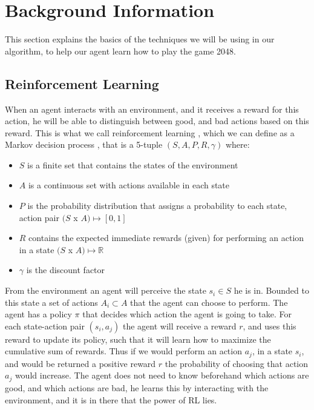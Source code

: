 \documentclass[a4paper,12pt]{article}
\begin{document}
\section{Background Information}
This section explains the basics of the techniques we will be using in our algorithm, to help our agent learn how to play the game 2048. 
\subsection{Reinforcement Learning}
When an agent interacts with an environment, and it receives a reward for this action, he will be able to distinguish between good, and bad actions based on this reward. This is what we call reinforcement learning \cite{sutton1998rl}, which we can define as a Markov decision process \cite{howard1960mdp}, that is a 5-tuple $(S, A, P, R, \gamma)$ where:
\begin{itemize}
\item $S$ is a finite set that contains the states of the environment
\item $A$ is a continuous set with actions available in each state
\item $P$ is the probability distribution that assigns a probability to each state, action pair $(S$ x $A) \mapsto [0,1]$
\item $R$ contains the expected immediate rewards (given) for performing an action in a state $(S$ x $A) \mapsto \mathbb{R}$
\item $\gamma$ is the discount factor
\end{itemize}
From the environment an agent will perceive the state $s_{i} \in S$ he is in. Bounded to this state a set of actions $A_{i} \subset A$ that the agent can choose to perform. The agent has a policy $\pi$ that decides which action the agent is going to take. For each state-action pair $(s_{i}, a_{j})$ the agent will receive a reward $r$, and uses this reward to update its policy, such that it will learn how to maximize the cumulative sum of rewards. Thus if we would perform an action $a_{j}$, in a state $s_{i}$, and would be returned a positive reward $r$ the probability of choosing that action $a_{j}$ would increase. The agent does not need to know beforehand which actions are good, and which actions are bad, he learns this by interacting with the environment, and it is in there that the power of RL lies.
\end{document}
